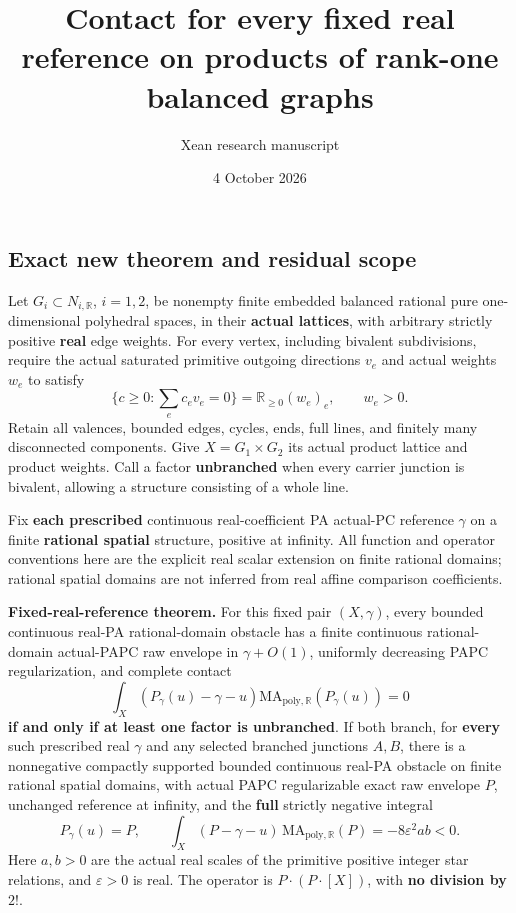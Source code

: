\documentclass[
  11pt,
]{article}
\title{Contact for every fixed real reference on products of rank-one
balanced graphs}
\author{Xean research manuscript}
\date{4 October 2026}
\begin{document}
\maketitle

\subsection{Exact new theorem and residual
scope}\label{exact-new-theorem-and-residual-scope}

Let \(G_i\subset N_{i,\mathbb{R}}\), \(i=1,2\), be nonempty finite
embedded balanced rational pure one-dimensional polyhedral spaces, in
their \textbf{actual lattices}, with arbitrary strictly positive
\textbf{real} edge weights. For every vertex, including bivalent
subdivisions, require the actual saturated primitive outgoing directions
\(v_e\) and actual weights \(w_e\) to satisfy \[
 \{c\geq0:\sum_e c_e v_e=0\}=\mathbb{R}_{\geq0}(w_e)_e,
 \qquad w_e>0.                                                \tag{1}
\] Retain all valences, bounded edges, cycles, ends, full lines, and
finitely many disconnected components. Give \(X=G_1\times G_2\) its
actual product lattice and product weights. Call a factor
\textbf{unbranched} when every carrier junction is bivalent, allowing a
structure consisting of a whole line.

Fix \textbf{each prescribed} continuous real-coefficient PA actual-PC
reference \(\gamma\) on a finite \textbf{rational spatial} structure,
positive at infinity. All function and operator conventions here are the
explicit real scalar extension on finite rational domains; rational
spatial domains are not inferred from real affine comparison
coefficients.

\textbf{Fixed-real-reference theorem.} For this fixed
pair \((X,\gamma)\), every bounded continuous real-PA rational-domain
obstacle has a finite continuous rational-domain actual-PAPC raw
envelope in \(\gamma+O(1)\), uniformly decreasing PAPC regularization,
and complete contact \[
 \int_X(P_\gamma(u)-\gamma-u)
                \mathrm{MA}_{\mathrm{poly},\mathbb{R}}(P_\gamma(u))=0    \tag{2}
\] \textbf{if and only if at least one factor is unbranched}. If both
branch, for \textbf{every} such prescribed real \(\gamma\) and any
selected branched junctions \(A,B\), there is a nonnegative compactly
supported bounded continuous real-PA obstacle on finite rational spatial
domains, with actual PAPC regularizable exact raw envelope \(P\),
unchanged reference at infinity, and the \textbf{full} strictly negative
integral \[
 P_\gamma(u)=P,\qquad
 \int_X(P-\gamma-u)\,\mathrm{MA}_{\mathrm{poly},\mathbb{R}}(P)
                             =-8\varepsilon^2ab<0.            \tag{3}
\] Here \(a,b>0\) are the actual real scales of the primitive positive
integer star relations, and \(\varepsilon>0\) is real. The operator is
\(P\cdot(P\cdot[X])\), with \textbf{no division by \(2!\)}.
\end{document}
